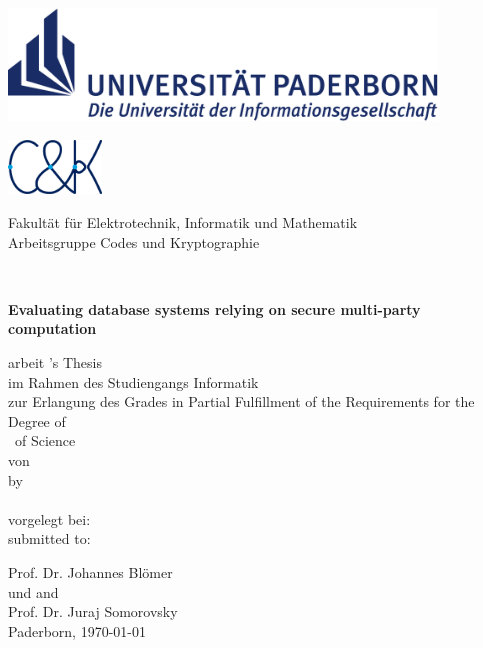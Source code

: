 \thispagestyle{empty}
\begin{titlepage}
\begin{center}

	\begin{minipage}{14cm}
		\hspace*{1.9cm}
		\includegraphics[height=3cm]{figures/upb_logo}\\
		\hspace*{1.15cm}
		\begin{minipage}{2.8cm}
			\includegraphics[width=2.5cm]{figures/cuk_logo_2019}
		\end{minipage}
		\begin{minipage}{9.8cm}
			\vspace*{5pt}
			\textsf{%
			Fakultät für Elektrotechnik, Informatik und Mathematik \\
			Arbeitsgruppe Codes und Kryptographie
			}
		\end{minipage}
	\end{minipage}\\[60pt]

	\begin{doublespace}
		{\Huge\textbf{Evaluating database systems relying on secure multi-party computation }}\\[30pt]
	\end{doublespace}

	{\Large
		\ifgerman
			\Degree arbeit
		\else
			\Degree 's Thesis
		\fi
	}\\[6pt]
		\ifgerman
			im Rahmen des Studiengangs Informatik\\
			zur Erlangung des Grades
		\else
			in Partial Fulfillment of the Requirements for the\\
			Degree of
		\fi
		\\[6pt]
  	{\Large \Degree\ of Science}\\[54pt] %

	\ifgerman
		von\\
	\else
		by\\
	\fi
	{\scshape\large \Author}\\[54pt]

	\ifgerman
		vorgelegt bei:\\
	\else
		submitted to:\\
	\fi

	{\large Prof. Dr. Johannes Blömer \\
	\ifgerman
		und
	\else
		and
	\fi
	\\[6pt]
	\large Prof. Dr. Juraj Somorovsky  }\\[30pt]

	{Paderborn, \today}

\end{center}
\end{titlepage}
\clearpage

